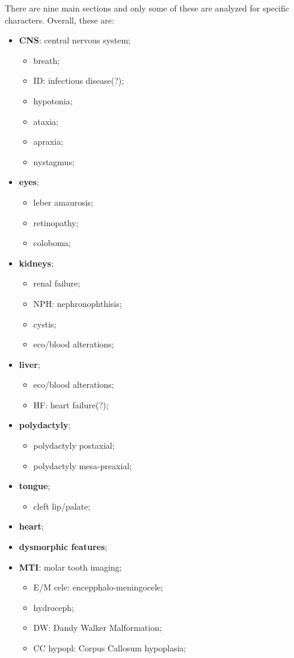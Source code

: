 \documentclass[a4paper]{report}
\begin{document}
There are nine main sections and only some of these are analyzed for specific characters. Overall, these are:
\begin{itemize}
   \item \textbf{CNS}: central nervous system;
	\begin{itemize}
      		\item breath;
		\item ID: infectious disease(?);
		\item hypotonia;
		\item ataxia;
		\item apraxia;
		\item nystagmus;
	\end{itemize}
    \item \textbf{eyes};
	\begin{itemize}
      		\item leber amaurosis;
		\item retinopathy;
		\item coloboma;
	\end{itemize}
    \item \textbf{kidneys};
	\begin{itemize}
      		\item renal failure;
		\item NPH: nephronophthisis;
		\item cystis;
		\item eco/blood alterations;
	\end{itemize}
    \item \textbf{liver};
	\begin{itemize}
      		\item eco/blood alterations;
		\item HF: heart failure(?);
	\end{itemize}
    \item \textbf{polydactyly};
	\begin{itemize}
      		\item polydactyly postaxial;
		\item polydactyly mesa-preaxial;
	\end{itemize}
    \item \textbf{tongue};
	\begin{itemize}
      		\item cleft lip/palate;
	\end{itemize}
     \item \textbf{heart};
     \item \textbf{dysmorphic features};
     \item \textbf{MTI}: molar tooth imaging;
	\begin{itemize}
      		\item E/M cele: encepphalo-meningocele;
		\item hydroceph;
      		\item DW: Dandy Walker Malformation;
		\item CC hypopl: Corpus Callosum hypoplasia;
	\end{itemize}
\end{itemize}
\end{document}
